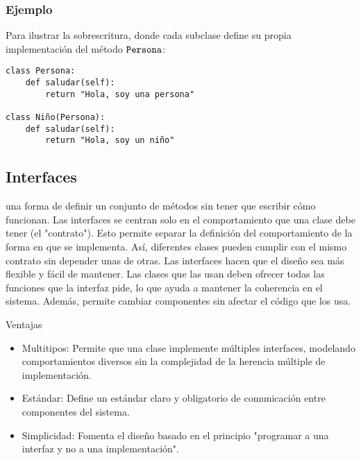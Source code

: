 \documentclass{article}
\begin{document}
\subsubsection*{Ejemplo}
Para ilustrar la sobrescritura, donde cada subclase define su propia implementación del método $\verb|Persona|$:
\begin{verbatim}
class Persona:
    def saludar(self):
        return "Hola, soy una persona"

class Niño(Persona):
    def saludar(self):
        return "Hola, soy un niño" 
\end{verbatim}

\subsection{Interfaces}
una forma de definir un conjunto de métodos sin tener que escribir cómo funcionan. Las 
interfaces se centran solo en el comportamiento que una clase debe tener (el "contrato"). 
Esto permite separar la definición del comportamiento de la forma en que se implementa. Así, 
diferentes clases pueden cumplir con el mismo contrato sin depender unas de otras. Las 
interfaces hacen que el diseño sea más flexible y fácil de mantener. Las clases que las usan 
deben ofrecer todas las funciones que la interfaz pide, lo que ayuda a mantener la coherencia 
en el sistema. Además, permite cambiar componentes sin afectar el código que los usa.

\par\vspace{1.2em} 

\large{Ventajas}
\begin{itemize}
    \item {Multitipos:} Permite que una clase implemente múltiples interfaces, modelando 
    comportamientos diversos sin la complejidad de la herencia múltiple de implementación.
    \item {Estándar:} Define un estándar claro y obligatorio de comunicación entre 
    componentes del sistema.
    \item {Simplicidad:} Fomenta el diseño basado en el principio "programar a una interfaz y 
    no a una implementación".
\end{itemize}
\end{document}

